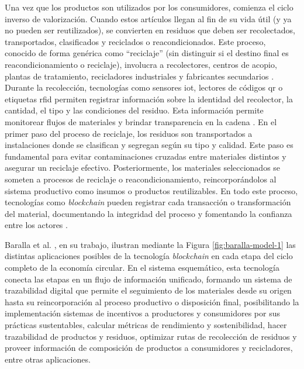 Una vez que los productos son utilizados por los consumidores, comienza el ciclo inverso de valorización. Cuando estos artículos llegan al fin de su vida útil (y ya no pueden ser reutilizados), se convierten en residuos que deben ser recolectados, transportados, clasificados y reciclados o reacondicionados. Este proceso, conocido de forma genérica como ``reciclaje'' (sin distinguir si el destino final es reacondicionamiento o reciclaje), involucra a recolectores, centros de acopio, plantas de tratamiento, recicladores industriales y fabricantes secundarios \cite{cepal2021economia}. Durante la recolección, tecnologías como sensores \gls{iot}, lectores de códigos \gls{qr} o etiquetas \gls{rfid} permiten registrar información sobre la identidad del recolector, la cantidad, el tipo y las condiciones del residuo. Esta información permite monitorear flujos de materiales y brindar transparencia en la cadena \cite{wong2024enhancing}. En el primer paso del proceso de reciclaje, los residuos son transportados a instalaciones donde se clasifican y segregan según su tipo y calidad. Este paso es fundamental para evitar contaminaciones cruzadas entre materiales distintos y asegurar un reciclaje efectivo. Posteriormente, los materiales seleccionados se someten a procesos de reciclaje o reacondicionamiento, reincorporándolos al sistema productivo como insumos o productos reutilizables. En todo este proceso, tecnologías como \textit{blockchain} pueden registrar cada transacción o transformación del material, documentando la integridad del proceso y fomentando la confianza entre los actores \cite{wong2024enhancing}.

Baralla et al. \cite{baralla2023waste}, en su trabajo, ilustran mediante la Figura \ref{fig:baralla-model-1} las distintas aplicaciones posibles de la tecnología \textit{blockchain} en cada etapa del ciclo completo de la economía circular. En el sistema esquemático, esta tecnología conecta las etapas en un flujo de información unificado, formando un sistema de trazabilidad digital que permite el seguimiento de los materiales desde su origen hasta su reincorporación al proceso productivo o disposición final, posibilitando la implementación sistemas de incentivos a productores y consumidores por sus prácticas sustentables, calcular métricas de rendimiento y sostenibilidad, hacer trazabilidad de productos y residuos, optimizar rutas de recolección de residuos y proveer información de composición de productos a consumidores y recicladores, entre otras aplicaciones.

